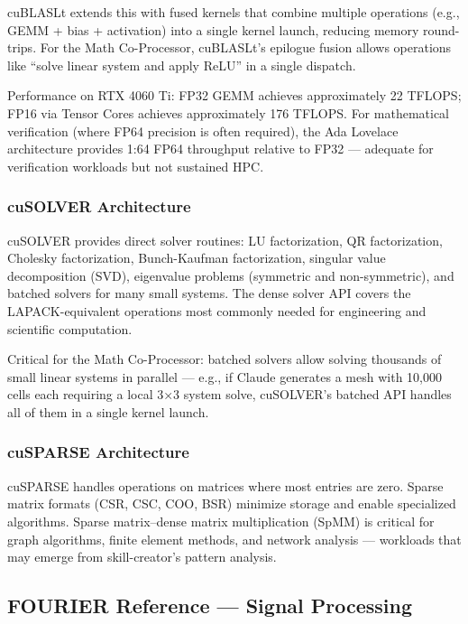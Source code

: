 \documentclass[11pt,letterpaper]{article}
\begin{document}
cuBLASLt extends this with fused kernels that combine multiple operations (e.g., GEMM + bias + activation) into a single kernel launch, reducing memory round-trips. For the Math Co-Processor, cuBLASLt's epilogue fusion allows operations like ``solve linear system and apply ReLU'' in a single dispatch.

Performance on RTX 4060 Ti: FP32 GEMM achieves approximately 22 TFLOPS; FP16 via Tensor Cores achieves approximately 176 TFLOPS. For mathematical verification (where FP64 precision is often required), the Ada Lovelace architecture provides 1:64 FP64 throughput relative to FP32 --- adequate for verification workloads but not sustained HPC.

\subsubsection{cuSOLVER Architecture}

cuSOLVER provides direct solver routines: LU factorization, QR factorization, Cholesky factorization, Bunch-Kaufman factorization, singular value decomposition (SVD), eigenvalue problems (symmetric and non-symmetric), and batched solvers for many small systems. The dense solver API covers the LAPACK-equivalent operations most commonly needed for engineering and scientific computation.

Critical for the Math Co-Processor: batched solvers allow solving thousands of small linear systems in parallel --- e.g., if Claude generates a mesh with 10,000 cells each requiring a local 3×3 system solve, cuSOLVER's batched API handles all of them in a single kernel launch.

\subsubsection{cuSPARSE Architecture}

cuSPARSE handles operations on matrices where most entries are zero. Sparse matrix formats (CSR, CSC, COO, BSR) minimize storage and enable specialized algorithms. Sparse matrix--dense matrix multiplication (SpMM) is critical for graph algorithms, finite element methods, and network analysis --- workloads that may emerge from skill-creator's pattern analysis.

\subsection{FOURIER Reference --- Signal Processing}
\end{document}
